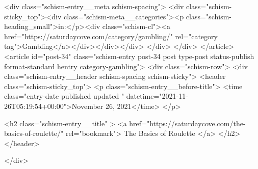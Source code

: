{		<div class="schism-entry__meta schism-spacing">			<div class="schism-sticky_top"><div class="schism-meta__categories"><p class="schism-heading_small">in:</p><div class="schism-cl"><a href="https://saturdaycove.com/category/gambling/" rel="category tag">Gambling</a></div></div></div>		</div>
	</div>
</article>
<article id="post-34" class="schism-entry post-34 post type-post status-publish format-standard hentry category-gambling">
	<div class="schism-row">		<div class="schism-entry__header schism-spacing schism-sticky">			<header class="schism-sticky_top">				<p class="schism-entry__before-title">
					<time class="entry-date published updated " datetime="2021-11-26T05:19:54+00:00">November 26, 2021</time>				</p>

				<h2 class="schism-entry__title" >
					<a href="https://saturdaycove.com/the-basics-of-roulette/" rel="bookmark">
						The Basics of Roulette					</a>
				</h2>
			</header>

					</div>

}
